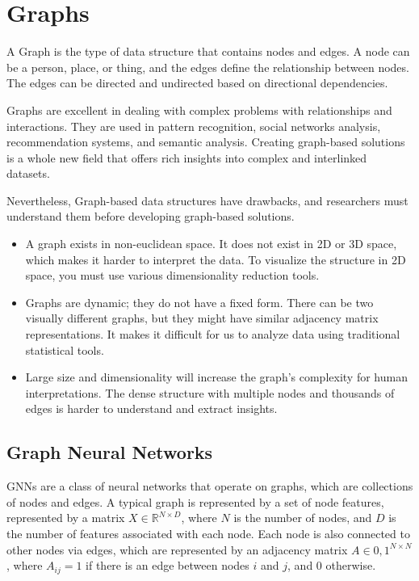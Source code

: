 \section{Graphs}
\label{sec:3_graphs}


A Graph is the type of data structure that contains nodes and edges. A node can be a person, place, or thing, and the edges define the relationship between nodes. The edges can be directed and undirected based on directional dependencies. 

Graphs are excellent in dealing with complex problems with relationships and interactions. They are used in pattern recognition, social networks analysis, recommendation systems, and semantic analysis. Creating graph-based solutions is a whole new field that offers rich insights into complex and interlinked datasets. 

Nevertheless, Graph-based data structures have drawbacks, and researchers must understand them before developing graph-based solutions.

\begin{itemize}
	\item A graph exists in non-euclidean space. It does not exist in 2D or 3D space, which makes it harder to interpret the data. To visualize the structure in 2D space, you must use various dimensionality reduction tools.
	\item Graphs are dynamic; they do not have a fixed form. There can be two visually different graphs, but they might have similar adjacency matrix representations. It makes it difficult for us to analyze data using traditional statistical tools.
	\item Large size and dimensionality will increase the graph's complexity for human interpretations. The dense structure with multiple nodes and thousands of edges is harder to understand and extract insights. 
\end{itemize}

\subsection{Graph Neural Networks}
\label{subsec:3_gnns}

GNNs are a class of neural networks that operate on graphs, which are collections of nodes and edges. A typical graph is represented by a set of node features, represented by a matrix $X \in \mathbb{R}^{N \times D}$, where $N$ is the number of nodes, and $D$ is the number of features associated with each node. Each node is also connected to other nodes via edges, which are represented by an adjacency matrix $A \in {0,1}^{N \times N}$, where $A_{ij} = 1$ if there is an edge between nodes $i$ and $j$, and $0$ otherwise.

